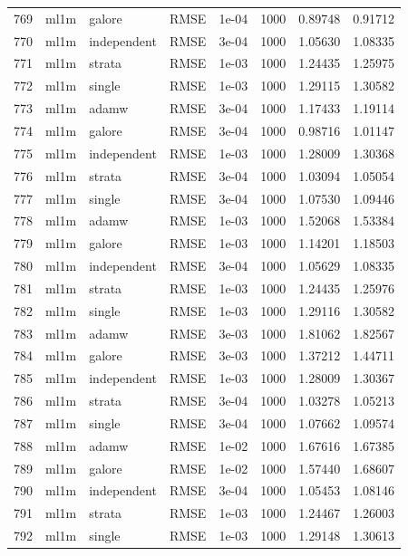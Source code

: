 \begin{longtable}{rlllrrrr}
769 & ml1m & galore & RMSE & 1e-04 & 1000 & 0.89748 & 0.91712 \\
770 & ml1m & independent & RMSE & 3e-04 & 1000 & 1.05630 & 1.08335 \\
\rowcolor{oursbg}
771 & ml1m & strata & RMSE & 1e-03 & 1000 & 1.24435 & 1.25975 \\
772 & ml1m & single & RMSE & 1e-03 & 1000 & 1.29115 & 1.30582 \\
773 & ml1m & adamw & RMSE & 3e-04 & 1000 & 1.17433 & 1.19114 \\
774 & ml1m & galore & RMSE & 3e-04 & 1000 & 0.98716 & 1.01147 \\
775 & ml1m & independent & RMSE & 1e-03 & 1000 & 1.28009 & 1.30368 \\
\rowcolor{oursbg}
776 & ml1m & strata & RMSE & 3e-04 & 1000 & 1.03094 & 1.05054 \\
777 & ml1m & single & RMSE & 3e-04 & 1000 & 1.07530 & 1.09446 \\
778 & ml1m & adamw & RMSE & 1e-03 & 1000 & 1.52068 & 1.53384 \\
779 & ml1m & galore & RMSE & 1e-03 & 1000 & 1.14201 & 1.18503 \\
780 & ml1m & independent & RMSE & 3e-04 & 1000 & 1.05629 & 1.08335 \\
\rowcolor{oursbg}
781 & ml1m & strata & RMSE & 1e-03 & 1000 & 1.24435 & 1.25976 \\
782 & ml1m & single & RMSE & 1e-03 & 1000 & 1.29116 & 1.30582 \\
783 & ml1m & adamw & RMSE & 3e-03 & 1000 & 1.81062 & 1.82567 \\
784 & ml1m & galore & RMSE & 3e-03 & 1000 & 1.37212 & 1.44711 \\
785 & ml1m & independent & RMSE & 1e-03 & 1000 & 1.28009 & 1.30367 \\
\rowcolor{oursbg}
786 & ml1m & strata & RMSE & 3e-04 & 1000 & 1.03278 & 1.05213 \\
787 & ml1m & single & RMSE & 3e-04 & 1000 & 1.07662 & 1.09574 \\
788 & ml1m & adamw & RMSE & 1e-02 & 1000 & 1.67616 & 1.67385 \\
789 & ml1m & galore & RMSE & 1e-02 & 1000 & 1.57440 & 1.68607 \\
790 & ml1m & independent & RMSE & 3e-04 & 1000 & 1.05453 & 1.08146 \\
\rowcolor{oursbg}
791 & ml1m & strata & RMSE & 1e-03 & 1000 & 1.24467 & 1.26003 \\
792 & ml1m & single & RMSE & 1e-03 & 1000 & 1.29148 & 1.30613 \\

\end{longtable}
